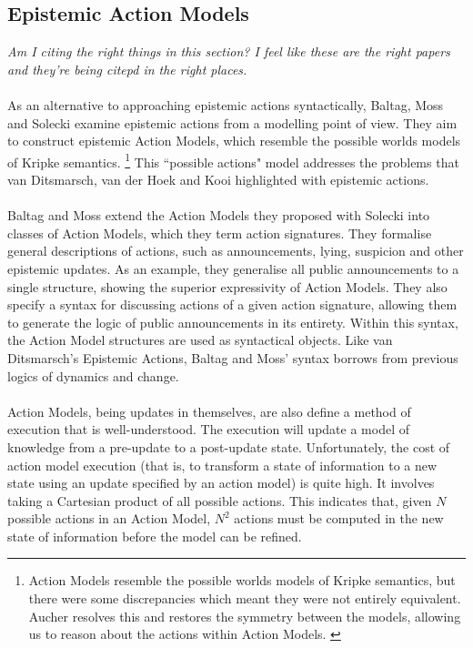 \documentclass[12pt, a4paper, twoside]{article}
\begin{document}
\subsection{Epistemic Action Models} \label{act_mods}
{\em Am I citing the right things in this section? I feel like these are the
	right papers and they're being citepd in the right places.}\\
\\
As an alternative to approaching epistemic actions syntactically, Baltag, Moss
and Solecki examine epistemic actions from a modelling point of view.
They aim to construct epistemic Action Models, which resemble the possible
worlds models of Kripke semantics. \citep{baltag1998lpa}
\footnote{Action Models resemble the possible worlds models of Kripke semantics,
but there were some discrepancies which meant they were not entirely equivalent.
Aucher resolves this and restores the symmetry between the models, allowing us
to reason about the actions within Action Models. \citep{aucher09revisited}}
This ``possible actions" model addresses the problems that van Ditsmarsch, van
der Hoek and Kooi highlighted with epistemic actions.\\
\\
Baltag and Moss extend the Action Models they proposed with Solecki into classes
of Action Models, which they term action signatures. \citep{baltag2005programs}
They formalise general descriptions of actions, such as announcements, lying,
suspicion and other epistemic updates.
As an example, they generalise all public announcements to a single structure,
showing the superior expressivity of Action Models.
They also specify a syntax for discussing actions of a given action signature,
allowing them to generate the logic of public announcements in its entirety.
Within this syntax, the Action Model structures are used as syntactical objects.
Like van Ditsmarsch's Epistemic Actions, Baltag and Moss' syntax borrows from
previous logics of dynamics and change.\\
\\
Action Models, being updates in themselves, are also define a method of
execution that is well-understood.
The execution will update a model of knowledge from a pre-update to a
post-update state.
Unfortunately, the cost of action model execution (that is, to transform a state
of information to a new state using an update specified by an action model) is
quite high.
It involves taking a Cartesian product of all possible actions.
This indicates that, given $N$ possible actions in an Action Model, $N^2$
actions must be computed in the new state of information before the model can
be refined.
\end{document}
